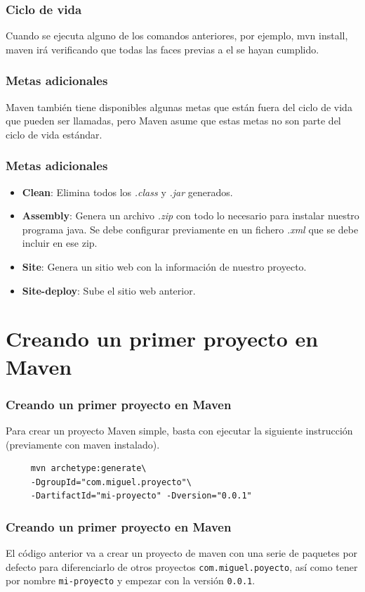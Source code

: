 \documentclass{beamer}
\begin{document}
 \begin{frame}
   \frametitle{Ciclo de vida}
   Cuando se ejecuta alguno de los comandos anteriores, por ejemplo,
   mvn install, maven irá verificando que todas las faces previas a el se
   hayan cumplido.
 \end{frame}

 \begin{frame}
   \frametitle{Metas adicionales}

   Maven también tiene disponibles algunas metas que están fuera del ciclo de vida
   que pueden ser llamadas, pero Maven asume que estas metas no son parte del ciclo
   de vida estándar.

 \end{frame}

 \begin{frame}
   \frametitle{Metas adicionales}
   \begin{itemize}[<+->]
   \item \textbf{Clean}: Elimina todos los \textsl{.class} y \textsl{.jar} generados.
   \item \textbf{Assembly}: Genera un archivo \textsl{.zip} con todo lo necesario para instalar
     nuestro programa java. Se debe configurar previamente en un fichero \textsl{.xml}
     que se debe incluir en ese zip.
   \item \textbf{Site}: Genera un sitio web con la información de nuestro proyecto.
   \item \textbf{Site-deploy}: Sube el sitio web anterior.
   \end{itemize}
 \end{frame}

\section{Creando un primer proyecto en Maven}

\begin{frame}[fragile]
   \frametitle{Creando un primer proyecto en Maven}
   Para crear un proyecto Maven simple, basta con ejecutar la
   siguiente instrucción (previamente con maven instalado).

   \begin{verbatim}
     mvn archetype:generate\
     -DgroupId="com.miguel.proyecto"\
     -DartifactId="mi-proyecto" -Dversion="0.0.1"
   \end{verbatim}
\end{frame}

\begin{frame}
  \frametitle{Creando un primer proyecto en Maven}
     El código anterior va a crear un proyecto de maven con una serie de paquetes por
     defecto para diferenciarlo de otros proyectos \texttt{com.miguel.poyecto}, así como tener
     por nombre \texttt{mi-proyecto} y empezar con la versión \texttt{0.0.1}.
\end{frame}
\end{document}
